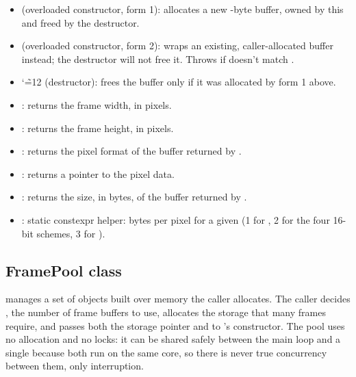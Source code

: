\begin{itemize}
    \item {} (overloaded constructor, form 1): allocates a new -byte buffer, owned by this  and freed by the destructor.
    \item {} (overloaded constructor, form 2): wraps an existing, caller-allocated buffer instead; the destructor will not free it. Throws  if  doesn't match .
    \item {\catcode`\~=12 } (destructor): frees the buffer only if it was allocated by form 1 above.
    \item {}: returns the frame width, in pixels.
    \item {}: returns the frame height, in pixels.
    \item {}: returns the pixel format of the buffer returned by .
    \item {}: returns a pointer to the pixel data.
    \item {}: returns the size, in bytes, of the buffer returned by .
    \item {}: static constexpr helper: bytes per pixel for a given  (1 for , 2 for the four 16-bit schemes, 3 for ).
\end{itemize}

\subsection{FramePool class}
\label{subsec:fpgasteel-framepool}

 manages a set of  objects built over memory the caller allocates. The caller decides , the number of frame buffers to use, allocates the storage that many frames require, and passes both the storage pointer and  to 's constructor. The pool uses no  allocation and no locks: it can be shared safely between the main loop and a single  because both run on the same core, so there is never true concurrency between them, only interruption.

